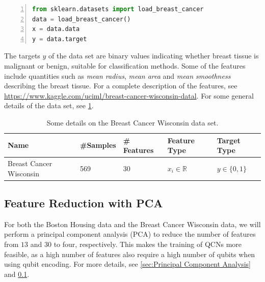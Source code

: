 \begin{lstlisting}[language=python, numbers=left]
from sklearn.datasets import load_breast_cancer
data = load_breast_cancer()
x = data.data
y = data.target
\end{lstlisting}

The targets $y$ of the data set are binary values indicating whether breast tissue is malignant or benign, suitable for classification methods. Some of the features include quantities such as \emph{mean radius}, \emph{mean area} and \emph{mean smoothness} describing the breast tissue. For a complete description of the features, see \url{https://www.kaggle.com/uciml/breast-cancer-wisconsin-datal}. For some general details of the data set, see \cref{tab:Cancer}.

\begin{table}[H]
\begin{tabular}{|l|l|l|l|l|}
\hline
 Name& \#Samples&  \# Features& Feature Type& Target Type \\ \hline
 Breast Cancer Wisconsin&  569&  30& $x_i \in \mathbb{R}$ & $y \in \{0,1\}$  \\ 
 \hline
 
\end{tabular}
\caption{Some details on the Breast Cancer Wisconsin data set.}
\label{tab:Cancer}
\end{table}


\subsection{Feature Reduction with PCA}\label{sec:Feature Reduction with PCA}
For both the Boston Housing data and the Breast Cancer Wisconsin data, we will perform a principal component analysis (PCA) to reduce the number of features from $13$ and $30$ to four, respectively. This makes the training of QCNs more feasible, as a high number of features also require a high number of qubits when using qubit encoding. For more details, see \cref{sec:Principal Component Analysis} and \cref{sec:Feature Reduction with PCA}.






